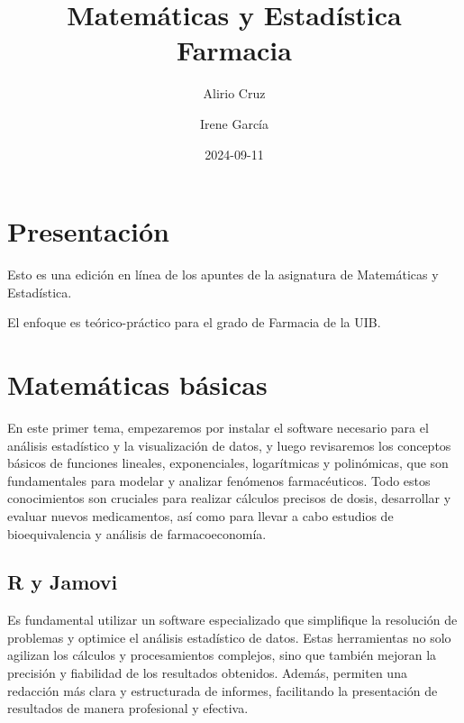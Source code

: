 \documentclass[
  letterpaper,
  DIV=11,
  numbers=noendperiod]{scrreprt}
\title{Matemáticas y Estadística Farmacia}
\author{Alirio Cruz \and Irene García}
\date{2024-09-11}
\renewcommand*\contentsname{Tabla de contenidos}
\newcommand\contentsname{Tabla de contenidos}
\begin{document}
\maketitle

\renewcommand*\contentsname{Tabla de contenidos}
{
\hypersetup{linkcolor=}
\setcounter{tocdepth}{2}
\tableofcontents
}

\chapter*{Presentación}\label{presentaciuxf3n}


Esto es una edición en línea de los apuntes de la asignatura de
Matemáticas y Estadística.

El enfoque es teórico-práctico para el grado de Farmacia de la UIB.


\chapter{Matemáticas básicas}\label{matemuxe1ticas-buxe1sicas}

En este primer tema, empezaremos por instalar el software necesario para
el análisis estadístico y la visualización de datos, y luego revisaremos
los conceptos básicos de funciones lineales, exponenciales, logarítmicas
y polinómicas, que son fundamentales para modelar y analizar fenómenos
farmacéuticos. Todo estos conocimientos son cruciales para realizar
cálculos precisos de dosis, desarrollar y evaluar nuevos medicamentos,
así como para llevar a cabo estudios de bioequivalencia y análisis de
farmacoeconomía.

\section{R y Jamovi}\label{r-y-jamovi}

Es fundamental utilizar un software especializado que simplifique la
resolución de problemas y optimice el análisis estadístico de datos.
Estas herramientas no solo agilizan los cálculos y procesamientos
complejos, sino que también mejoran la precisión y fiabilidad de los
resultados obtenidos. Además, permiten una redacción más clara y
estructurada de informes, facilitando la presentación de resultados de
manera profesional y efectiva.
\end{document}
